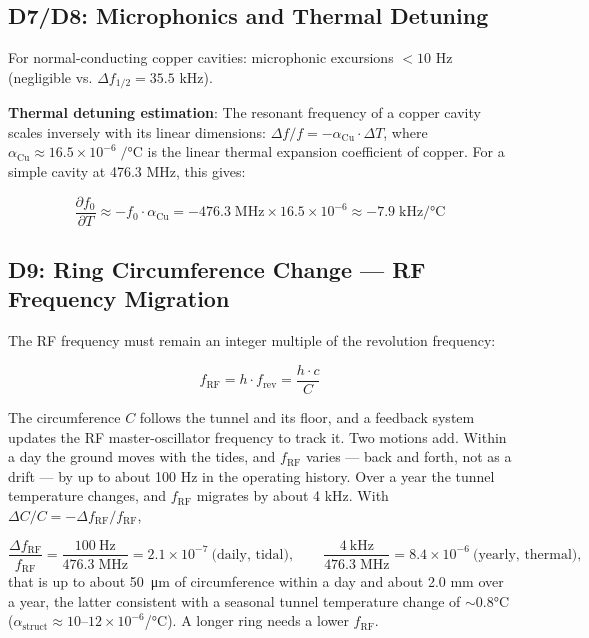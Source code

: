 \subsection{D7/D8: Microphonics and Thermal Detuning}\label{sec:d7d8}


For normal-conducting copper cavities: microphonic excursions \(< 10\) Hz (negligible vs. \(\Delta f_{1/2} = 35.5\) kHz).

\textbf{Thermal detuning estimation}: The resonant frequency of a copper cavity scales inversely with its linear dimensions: \(\Delta f/f = -\alpha_\text{Cu} \cdot \Delta T\), where \(\alpha_\text{Cu} \approx 16.5 \times 10^{-6}\;/\text{°C}\) is the linear thermal expansion coefficient of copper. For a simple cavity at 476.3 MHz, this gives:

\begin{equation}\label{eq:cav-thermal}
\frac{\partial f_0}{\partial T} \approx -f_0 \cdot \alpha_\text{Cu} = -476.3\;\text{MHz} \times 16.5 \times 10^{-6} \approx -7.9\;\text{kHz/°C}
\end{equation}


\subsection{D9: Ring Circumference Change --- RF Frequency Migration}\label{sec:d9}


The RF frequency must remain an integer multiple of the revolution frequency:

\begin{equation}\label{eq:harmonic}
f_\text{RF} = h \cdot f_\text{rev} = \frac{h \cdot c}{C}
\end{equation}

The circumference \(C\) follows the tunnel and its floor, and a feedback system updates the RF master-oscillator frequency to track it. Two motions add. Within a day the ground moves with the tides, and \(f_\text{RF}\) varies --- back and forth, not as a drift --- by up to about 100 Hz in the operating history. Over a year the tunnel temperature changes, and \(f_\text{RF}\) migrates by about 4 kHz. With \(\Delta C/C = -\Delta f_\text{RF}/f_\text{RF}\),

\begin{equation}\label{eq:dC-over-C}
\frac{\Delta f_\text{RF}}{f_\text{RF}} = \frac{\qty{100}{\hertz}}{476.3\;\text{MHz}} = 2.1\times10^{-7}\ \text{(daily, tidal)},
\qquad
\frac{\qty{4}{\kilo\hertz}}{476.3\;\text{MHz}} = 8.4\times10^{-6}\ \text{(yearly, thermal)},
\end{equation}
that is up to about \qty{50}{\micro\metre} of circumference within a day and about 2.0 mm over a year, the latter consistent with a seasonal tunnel temperature change of \(\sim 0.8\)°C (\(\alpha_\text{struct} \approx 10\)--\(12 \times 10^{-6}\)/°C). A longer ring needs a lower \(f_\text{RF}\).

